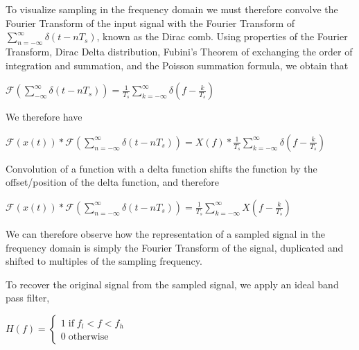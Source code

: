 \documentclass{article}
\begin{document}
To visualize sampling in the frequency domain we must therefore convolve the Fourier Transform of the input signal with the Fourier Transform of $\displaystyle\sum_{n=-\infty}^{\infty} \delta (t-nT_s)$, known as the Dirac comb.
Using properties of the Fourier Transform, Dirac Delta distribution, Fubini's Theorem of exchanging the order of integration and summation, 
and the Poisson summation formula, 
we obtain that 
\begin{center}
    \begin{math}
        \mathcal{F}\left(\displaystyle\sum_{-\infty}^{\infty} \delta (t-nT_s)\right) = \frac{1}{T_s} \displaystyle\sum_{k = -\infty}^{\infty} \delta \left( f - \frac{k}{T_s} \right)
    \end{math}  
\end{center}
We therefore have
\begin{center}
    \begin{math}
        \mathcal{F}(x(t)) * \mathcal{F}\left(\displaystyle \sum_{n=-\infty}^{\infty} \delta (t-nT_s) \right) = X(f) * \frac{1}{T_s}\displaystyle \sum_{k = -\infty}^{\infty} \delta \left( f - \frac{k}{T_s} \right)
    \end{math}  
\end{center}
Convolution of a function with a delta function shifts the function by the offset/position of the delta function, and therefore 
\begin{center}
    \begin{math}
        \mathcal{F}(x(t)) * \mathcal{F}\left(\displaystyle \sum_{n=-\infty}^{\infty} \delta (t-nT_s) \right) 
        = 
        \frac{1}{T_s} \displaystyle\sum_{k=-\infty}^{\infty}X\left(f - \frac{k}{T_s} \right)
    \end{math}  
\end{center}

We can therefore observe how the representation of a sampled signal in the frequency domain is simply the Fourier Transform of the signal, duplicated and shifted to multiples of the sampling frequency.

To recover the original signal from the sampled signal, we apply an ideal band pass filter,
\begin{center}
    \begin{math}
        H(f) =
        \begin{cases}
            1 \; \text{if} \; f_l < f < f_h \\
            0 \; \text{otherwise}
        \end{cases}
    \end{math}  
\end{center}
\end{document}
